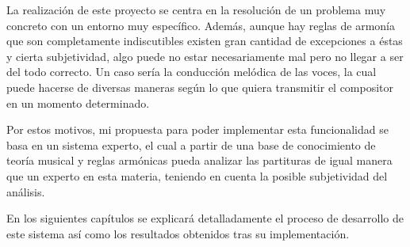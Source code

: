 La realización de este proyecto se centra en la resolución de un problema muy concreto con un entorno muy específico. Además, aunque hay reglas de armonía que son completamente indiscutibles existen gran cantidad de excepciones a éstas y cierta subjetividad, algo puede no estar necesariamente mal pero no llegar a ser del todo correcto. Un caso sería la conducción melódica de las voces, la cual puede hacerse de diversas maneras según lo que quiera transmitir el compositor en un momento determinado.

Por estos motivos, mi propuesta para poder implementar esta funcionalidad se basa en un sistema experto, el cual a partir de una base de conocimiento de teoría musical y reglas armónicas pueda analizar las partituras de igual manera que un experto en esta materia, teniendo en cuenta la posible subjetividad del análisis.

En los siguientes capítulos se explicará detalladamente el proceso de desarrollo de este sistema así como los resultados obtenidos tras su implementación. 